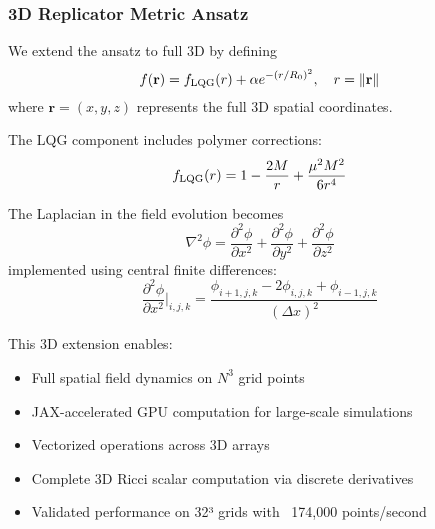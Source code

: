 \documentclass[11pt]{article}
\begin{document}
\subsubsection{3D Replicator Metric Ansatz}

We extend the ansatz to full 3D by defining
\[
f(\mathbf{r}) = f_{\rm LQG}(r) + \alpha e^{-(r/R_0)^2}, \quad r = \|\mathbf{r}\|
\]
where $\mathbf{r} = (x,y,z)$ represents the full 3D spatial coordinates.

The LQG component includes polymer corrections:
\[
f_{\rm LQG}(r) = 1 - \frac{2M}{r} + \frac{\mu^2 M^2}{6r^4}
\]

The Laplacian in the field evolution becomes
\[
\nabla^2\phi = \frac{\partial^2\phi}{\partial x^2} + \frac{\partial^2\phi}{\partial y^2} + \frac{\partial^2\phi}{\partial z^2}
\]
implemented using central finite differences:
\[
\frac{\partial^2\phi}{\partial x^2}\bigg|_{i,j,k} = \frac{\phi_{i+1,j,k} - 2\phi_{i,j,k} + \phi_{i-1,j,k}}{(\Delta x)^2}
\]

This 3D extension enables:
\begin{itemize}
\item Full spatial field dynamics on $N^3$ grid points
\item JAX-accelerated GPU computation for large-scale simulations  
\item Vectorized operations across 3D arrays
\item Complete 3D Ricci scalar computation via discrete derivatives
\item Validated performance on 32³ grids with ~174,000 points/second
\end{itemize}
\end{document}
